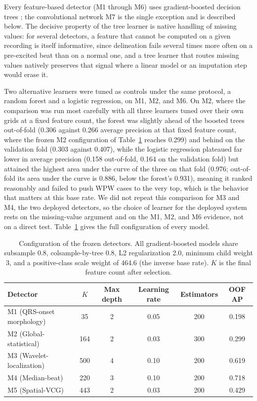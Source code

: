 \documentclass[11pt]{article}
\begin{document}
Every feature-based detector (M1 through M6) uses gradient-boosted decision trees \cite{xgboost}; the convolutional network M7 is the single exception and is described below. The decisive property of the tree learner is native handling of missing values: for several detectors, a feature that cannot be computed on a given recording is itself informative, since delineation fails several times more often on a pre-excited beat than on a normal one, and a tree learner that routes missing values natively preserves that signal where a linear model or an imputation step would erase it.

Two alternative learners were tuned as controls under the same protocol, a random forest and a logistic regression, on M1, M2, and M6. On M2, where the comparison was run most carefully with all three learners tuned over their own grids at a fixed feature count, the forest was slightly ahead of the boosted trees out-of-fold (0.306 against 0.266 average precision at that fixed feature count, where the frozen M2 configuration of Table~\ref{tab:hyper} reaches 0.299) and behind on the validation fold (0.303 against 0.407), while the logistic regression plateaued far lower in average precision (0.158 out-of-fold, 0.164 on the validation fold) but attained the highest area under the curve of the three on that fold (0.976; out-of-fold its area under the curve is 0.886, below the forest's 0.931), meaning it ranked reasonably and failed to push WPW cases to the very top, which is the behavior that matters at this base rate. We did not repeat this comparison for M3 and M4, the two deployed detectors, so the choice of learner for the deployed system rests on the missing-value argument and on the M1, M2, and M6 evidence, not on a direct test. Table~\ref{tab:hyper} gives the full configuration of every model.

\begin{table}[t]
  \centering
  \small
  \caption{Configuration of the frozen detectors. All gradient-boosted models share subsample 0.8, colsample-by-tree 0.8, L2 regularization 2.0, minimum child weight 3, and a positive-class scale weight of 464.6 (the inverse base rate). $K$ is the final feature count after selection.}
  \label{tab:hyper}
  \begin{tabular}{@{}lccccc@{}}
    \toprule
    Detector & $K$ & Max depth & Learning rate & Estimators & OOF AP \\
    \midrule
    M1 (QRS-onset morphology) & 35  & 2 & 0.05 & 200 & 0.198 \\
    M2 (Global-statistical)   & 164 & 2 & 0.03 & 300 & 0.299 \\
    M3 (Wavelet-localization) & 500 & 4 & 0.10 & 200 & 0.619 \\
    M4 (Median-beat)          & 220 & 3 & 0.10 & 200 & 0.718 \\
    M5 (Spatial-VCG)          & 443 & 2 & 0.03 & 200 & 0.429 \\
    \bottomrule
  \end{tabular}
\end{table}
\end{document}
